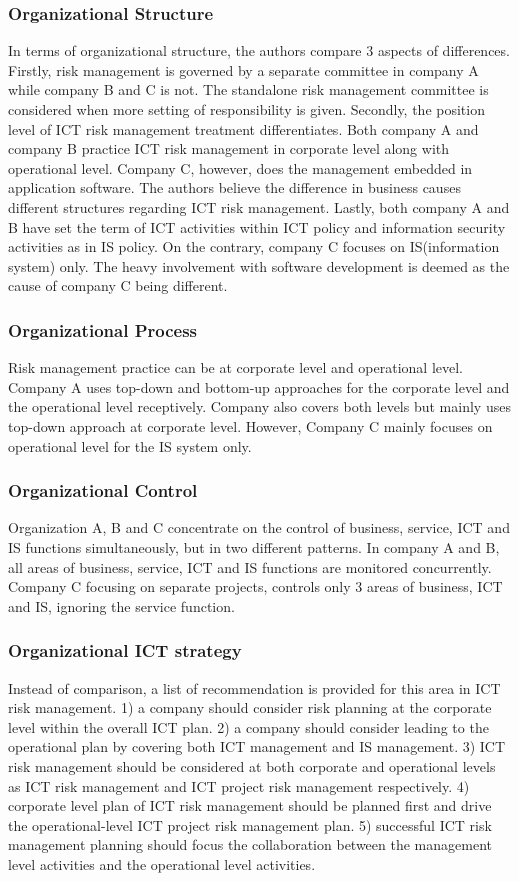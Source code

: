 \subsubsection{Organizational Structure}
In terms of organizational structure, the authors compare 3 aspects of differences. Firstly, risk management is governed by a separate committee in company A while company B and C is not. The standalone risk management committee is considered when more setting of responsibility is given. Secondly, the position level of ICT risk management treatment differentiates. Both company A and company B practice ICT risk management in corporate level along with operational level. Company C, however, does the management embedded in application software. The authors believe the difference in business causes different structures regarding ICT risk management. Lastly, both company A and B have set the term of ICT activities within ICT policy and information security activities as in IS policy. On the contrary, company C focuses on IS(information system) only. The heavy involvement with software development is deemed as the cause of company C being different.

\subsubsection{Organizational Process}
Risk management practice can be at corporate level and operational level. Company A uses top-down and bottom-up approaches for the corporate level and the operational level receptively. Company also covers both levels but mainly uses top-down approach at corporate level. However, Company C mainly focuses on operational level for the IS system only.

\subsubsection{Organizational Control}
Organization A, B and C concentrate on the control of business, service, ICT and IS functions simultaneously, but in two different patterns. In company A and B, all areas of business, service, ICT and IS functions are monitored concurrently. Company C focusing on separate projects, controls only 3 areas of business, ICT and IS, ignoring the service function.

\subsubsection{Organizational ICT strategy}
Instead of comparison, a list of recommendation is provided for this area in ICT risk management. 1) a company should consider risk planning at the corporate level within the overall ICT plan. 2) a company should consider leading to the operational plan by covering both ICT management and IS management. 3) ICT risk management should be considered at both corporate and operational levels as ICT risk management and ICT project risk management respectively. 4) corporate level plan of ICT risk management should be planned first and drive the operational-level ICT project risk management plan. 5) successful ICT risk management planning should focus the collaboration between the management level activities and the operational level activities.

